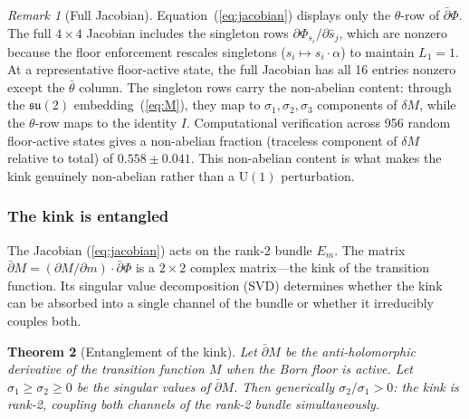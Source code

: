 \documentclass[11pt,a4paper]{article}
\newtheorem{theorem}{Theorem}[section]
\theoremstyle{definition}
\theoremstyle{remark}
\newtheorem{remark}[theorem]{Remark}
\newcommand{\dbar}{\bar{\partial}}
\newcommand{\su}{\mathfrak{su}}
\begin{document}
\begin{remark}[Full Jacobian]\label{rem:fulljacobian}
Equation~(\ref{eq:jacobian}) displays only the $\theta$-row of $\dbar\Phi$. The full $4\times 4$ Jacobian includes the singleton rows $\partial\Phi_{s_i}/\partial\bar{s}_j$, which are nonzero because the floor enforcement rescales singletons ($s_i\mapsto s_i\cdot\alpha$) to maintain $L_1=1$. At a representative floor-active state, the full Jacobian has all 16 entries nonzero except the $\bar{\theta}$ column. The singleton rows carry the non-abelian content: through the $\su(2)$ embedding~(\ref{eq:M}), they map to $\sigma_1,\sigma_2,\sigma_3$ components of $\delta M$, while the $\theta$-row maps to the identity $I$. Computational verification across 956 random floor-active states gives a non-abelian fraction (traceless component of $\delta M$ relative to total) of $0.558\pm 0.041$. This non-abelian content is what makes the kink genuinely non-abelian rather than a $\mathrm{U}(1)$ perturbation.
\end{remark}

\subsubsection{The kink is entangled}

The Jacobian (\ref{eq:jacobian}) acts on the rank-2 bundle $E_m$. The matrix $\dbar M = (\partial M/\partial m)\cdot\dbar\Phi$ is a $2\times 2$ complex matrix---the kink of the transition function. Its singular value decomposition (SVD) determines whether the kink can be absorbed into a single channel of the bundle or whether it irreducibly couples both.

\begin{theorem}[Entanglement of the kink]\label{thm:entangle}
Let $\dbar M$ be the anti-holomorphic derivative of the transition function $M$ when the Born floor is active. Let $\sigma_1\geq\sigma_2\geq 0$ be the singular values of $\dbar M$. Then generically $\sigma_2/\sigma_1>0$: the kink is rank-2, coupling both channels of the rank-2 bundle simultaneously.
\end{theorem}
\end{document}
